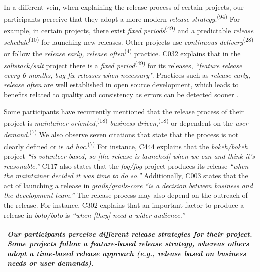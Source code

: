 In a different vein, when explaining the release process of certain projects, our participants perceive that they adopt a more modern \textit{release strategy}.\textsuperscript{(94)} For example, in certain projects, there exist \textit{fixed periods}\textsuperscript{(49)} and a predictable \textit{release schedule}\textsuperscript{(10)} for launching new releases. Other projects use \textit{continuous delivery}\textsuperscript{(28)} or follow the \textit{release early, release often}\textsuperscript{(4)} practice. C032 explains that in the \textit{saltstack/salt} project there is a \textit{fixed period}\textsuperscript{(49)} for its releases, \textit{``feature release every 6 months, bug fix releases when necessary"}. 
Practices such as \textit{release early, release often} are well established in open source development, which leads to benefits related to quality and consistency as errors can be detected sooner \citep{fitzgerald2017continuous}.   

Some participants have recurrently mentioned that the release process of their project is \textit{maintainer oriented},\textsuperscript{(18)} \textit{business driven},\textsuperscript{(18)} or dependent on the \textit{user demand}.\textsuperscript{(7)} We also observe seven citations that state that the process is not clearly defined or is \textit{ad hoc}.\textsuperscript{(7)} For instance, C444 explains that the \textit{bokeh/bokeh} project \textit{``is volunteer based, so [the release is launched] when we can and think it's reasonable.''} C117 also states that the \textit{fog/fog} project produces its release \textit{``when the maintainer decided it was time to do so.''} Additionally, C003 states that the act of launching a release in \textit{grails/grails-core} \textit{``is a decision between business and the development team.''} The release process may also depend on the outreach of the release. For instance, C302 explains that an important factor to produce a release in \textit{boto/boto} is \textit{``when [they] need a wider audience.''}

\begin{center}
	\begin{tabular}{|p{}|}
		\hline
	\textit{Our participants perceive different release strategies for their project. Some projects follow a feature-based release strategy, whereas others adopt a time-based release approach (e.g., release based on business needs or user demands).} \\
		\hline
	\end{tabular}
\end{center}

